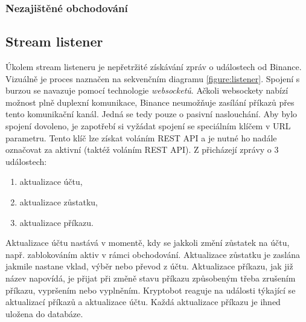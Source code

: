 \subsubsection{Nezajištěné obchodování}

\subsection{Stream listener}
Úkolem stream listeneru je nepřetržité získávání zpráv o událostech od Binance. Vizuálně je proces naznačen na sekvenčním diagramu \ref{figure:listener}.
Spojení s burzou se navazuje pomocí technologie \emph{websocketů}. Ačkoli websockety nabízí možnost plně duplexní komunikace, Binance
neumožňuje zasílání příkazů přes tento komunikační kanál. Jedná se tedy pouze o pasivní naslouchání. Aby bylo spojení dovoleno, je zapotřebí si vyžádat spojení se speciálním klíčem v URL parametru.
Tento klíč lze získat voláním REST API a je nutné ho nadále označovat za aktivní (taktéž voláním REST API). Z přicházejí zprávy o 3 událostech:
\begin{enumerate}
    \item aktualizace účtu,
    \item aktualizace zůstatku,
    \item aktualizace příkazu.
\end{enumerate}
Aktualizace účtu nastává v momentě, kdy se jakkoli změní zůstatek na účtu, např. zablokováním aktiv v rámci obchodování. Aktualizace zůstatku je zaslána jakmile nastane vklad, výběr nebo převod z účtu.
Aktualizace příkazu, jak již název napovídá, je přijat při změně stavu příkazu způsobeným třeba zrušením příkazu, vypršením nebo vyplněním. Kryptobot reaguje na události týkající se aktualizací příkazů
a aktualizace účtu. Každá aktualizace příkazu je ihned uložena do databáze.

